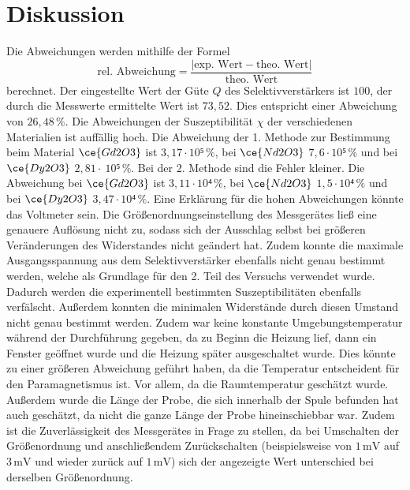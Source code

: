 %

\section{Diskussion}
\label{sec:Diskussion}
Die Abweichungen werden mithilfe der Formel
\begin{equation*}
    \text{rel. Abweichung} = \frac{|\text{exp. Wert} - \text{theo. Wert}|}{\text{theo. Wert}}
  \end{equation*}
berechnet. Der eingestellte Wert der Güte $Q$ des Selektivverstärkers ist $100$, der durch die Messwerte ermittelte Wert ist $73,52$. Dies entspricht einer Abweichung
von $26,48 \,\%$.
Die Abweichungen der Suszeptibilität $\chi$ der verschiedenen Materialien ist auffällig hoch. Die Abweichung der 1. Methode zur Bestimmung beim Material $\ce{Gd2O3}$ ist 
$3,17 \cdot 10⁵ \, \%$, bei $\ce{Nd2O3}$ $7,6 \cdot 10⁵ \, \%$ und bei $\ce{Dy2O3}$ $2,81 \cdot \ 10⁵ \, \%$. Bei der 2. Methode sind die Fehler kleiner. Die Abweichung bei
$\ce{Gd2O3}$ ist $3,11 \cdot 10⁴ \, \%$, bei $\ce{Nd2O3}$ $1,5 \cdot 10⁴ \, \%$ und bei $\ce{Dy2O3}$ $3,47 \cdot 10⁴ \, \%$.
Eine Erklärung für die hohen Abweichungen könnte das Voltmeter sein. Die Größenordnungseinstellung des Messgerätes ließ eine genauere Auflösung nicht zu, sodass sich
der Ausschlag selbst bei größeren Veränderungen des Widerstandes nicht geändert hat. Zudem konnte die maximale Ausgangsspannung aus dem Selektivverstärker 
ebenfalls nicht genau bestimmt werden, welche als Grundlage für den 2. Teil des Versuchs verwendet wurde. Dadurch werden die experimentell bestimmten Suszeptibilitäten 
ebenfalls verfälscht. 
Außerdem konnten die minimalen Widerstände durch diesen Umstand nicht genau bestimmt werden. Zudem war keine konstante Umgebungstemperatur während der Durchführung 
gegeben, da zu Beginn die Heizung lief, dann ein Fenster geöffnet wurde und die Heizung später ausgeschaltet wurde. Dies könnte zu einer größeren Abweichung geführt 
haben, da die Temperatur entscheident für den Paramagnetismus ist. Vor allem, da die Raumtemperatur geschätzt wurde.
Außerdem wurde die Länge der Probe, die sich innerhalb der Spule befunden hat auch geschätzt, da nicht die ganze Länge der Probe hineinschiebbar war. Zudem ist die 
Zuverlässigkeit des Messgerätes in Frage zu stellen, da bei Umschalten der Größenordnung und anschließendem Zurückschalten (beispielsweise von 
$1 \, \unit{\milli\volt}$ auf $3 \, \unit{\milli\volt}$ und wieder zurück auf $1 \, \unit{\milli\volt}$) sich der angezeigte Wert 
unterschied bei derselben Größenordnung. 
